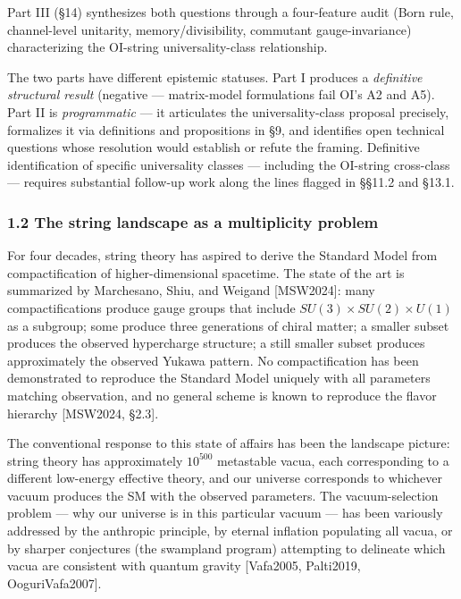 \documentclass[
]{article}
\begin{document}
Part III (§14) synthesizes both questions through a four-feature audit
(Born rule, channel-level unitarity, memory/divisibility, commutant
gauge-invariance) characterizing the OI-string universality-class
relationship.

The two parts have different epistemic statuses. Part I produces a
\emph{definitive structural result} (negative --- matrix-model
formulations fail OI's A2 and A5). Part II is \emph{programmatic} --- it
articulates the universality-class proposal precisely, formalizes it via
definitions and propositions in §9, and identifies open technical
questions whose resolution would establish or refute the framing.
Definitive identification of specific universality classes --- including
the OI-string cross-class --- requires substantial follow-up work along
the lines flagged in §§11.2 and §13.1.

\hypertarget{the-string-landscape-as-a-multiplicity-problem}{%
\subsubsection{1.2 The string landscape as a multiplicity
problem}\label{the-string-landscape-as-a-multiplicity-problem}}

For four decades, string theory has aspired to derive the Standard Model
from compactification of higher-dimensional spacetime. The state of the
art is summarized by Marchesano, Shiu, and Weigand {[}MSW2024{]}: many
compactifications produce gauge groups that include
\(SU(3) \times SU(2) \times U(1)\) as a subgroup; some produce three
generations of chiral matter; a smaller subset produces the observed
hypercharge structure; a still smaller subset produces approximately the
observed Yukawa pattern. No compactification has been demonstrated to
reproduce the Standard Model uniquely with all parameters matching
observation, and no general scheme is known to reproduce the flavor
hierarchy {[}MSW2024, §2.3{]}.

The conventional response to this state of affairs has been the
landscape picture: string theory has approximately \(10^{500}\)
metastable vacua, each corresponding to a different low-energy effective
theory, and our universe corresponds to whichever vacuum produces the SM
with the observed parameters. The vacuum-selection problem --- why our
universe is in this particular vacuum --- has been variously addressed
by the anthropic principle, by eternal inflation populating all vacua,
or by sharper conjectures (the swampland program) attempting to
delineate which vacua are consistent with quantum gravity {[}Vafa2005,
Palti2019, OoguriVafa2007{]}.
\end{document}
